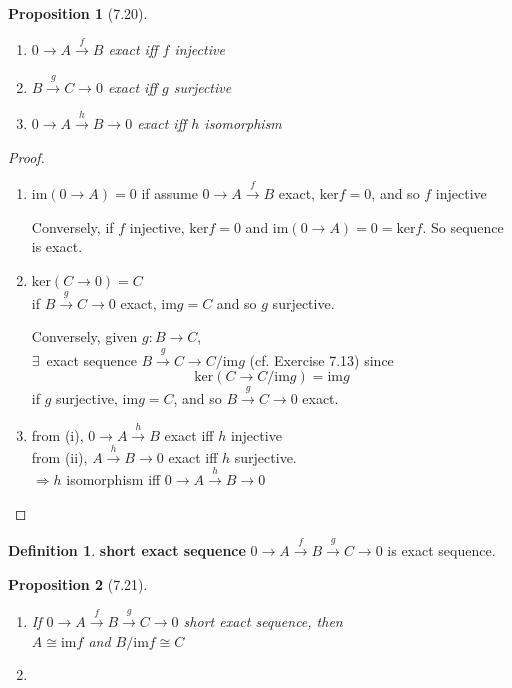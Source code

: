 \documentclass[twoside,landscape]{amsart}
\theoremstyle{plain}
\newtheorem{proposition}{Proposition}
\theoremstyle{definition}
\newtheorem{definition}{Definition}
\theoremstyle{remark}
\begin{document}
\begin{multicols*}{2}
\begin{proposition}[7.20]
  \begin{enumerate}
    \item[(i)] $0 \to A \xrightarrow{f} B$ exact iff $f$ injective 
    \item[(ii)] $B \xrightarrow{g} C \to 0$ exact iff $g$ surjective 
    \item[(iii)] $0 \to A \xrightarrow{h} B \to 0$ exact iff $h$ isomorphism
\end{enumerate}
\end{proposition}

\begin{proof}
  \begin{enumerate}
    \item[(i)] $\text{im}(0\to A) =0$ 
if assume $0 \to A \xrightarrow{f} B$ exact, $\text{ker}{f} =0$, and so $f$ injective

Conversely, if $f$ injective, $\text{ker}f=0$ and $\text{im}(0\to A)=0 = \text{ker}f$.  So sequence is exact.  
    \item[(ii)] $\text{ker}(C\to 0) = C$ \\
if $B\xrightarrow{g} C \to 0$ exact, $\text{im}g = C$ and so $g$ surjective.  

Conversely, given $g: B \to C$, \\
\phantom{Conversely} $\exists \, $ exact sequence $B \xrightarrow{g} C \to C/\text{im}g$ (cf. Exercise 7.13) since
\[
\text{ker}(C\to C/\text{im}g) = \text{im}g
\]
if $g$ surjective, $\text{im}g =C$, and so $B\xrightarrow{g}C \to 0$ exact.
    \item[(iii)] from (i), $0 \to A \xrightarrow{h} B$ exact iff $h$ injective \\
from (ii), $A \xrightarrow{h} B \to 0$ exact iff $h$ surjective.  \\
$\Longrightarrow  h$ isomorphism iff $0 \to A \xrightarrow{h} B \to 0$
\end{enumerate}
\end{proof}

\begin{definition}
  \textbf{short exact sequence } $0 \to A \xrightarrow{f} B \xrightarrow{g} C \to 0$ is exact sequence. 
\end{definition}

\begin{proposition}[7.21]
  \begin{enumerate}
\item[(i)] If $0 \to A \xrightarrow{f} B \xrightarrow{g} C \to 0$ short exact sequence, then \\
$A \cong \text{im}f$ and $B/\text{im}f \cong C$
\item[(ii)]
\end{enumerate}
\end{proposition}


\end{multicols*}
\end{document}
